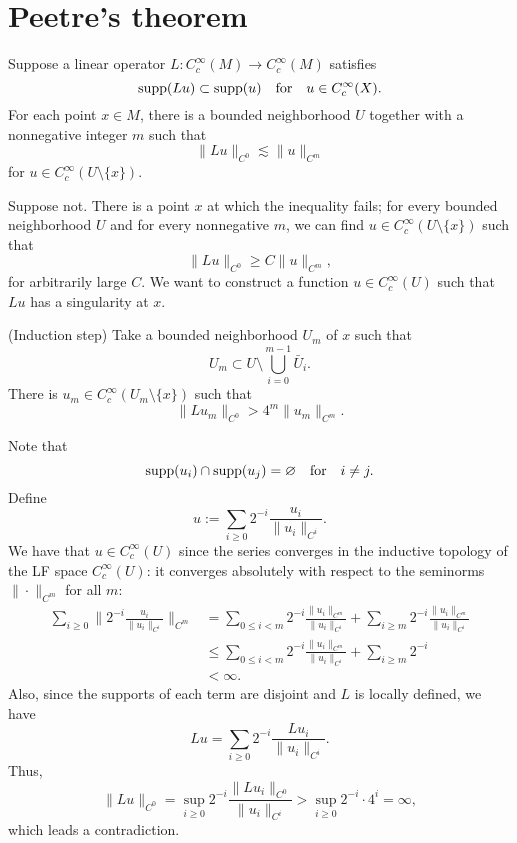 \documentclass[a4paper]{article}
\begin{document}
\section{Peetre's theorem}


\begin{lem}
Suppose a linear operator $L:C_c^\infty(M)\to C_c^\infty(M)$ satisfies
\[\operatorname{supp}(Lu)\subset\operatorname{supp}(u)\quad\text{for}\quad u\in C_c^\infty(X).\]
For each point $x\in M$, there is a bounded neighborhood $U$ together with a nonnegative integer $m$ such that 
\[\|Lu\|_{C^0}\lesssim\|u\|_{C^m}\]
for $u\in C_c^\infty(U\setminus\{x\})$.
\end{lem}
\begin{pf}
Suppose not.
There is a point $x$ at which the inequality fails; for every bounded neighborhood $U$ and for every nonnegative $m$, we can find $u\in C_c^\infty(U\setminus\{x\})$ such that
\[\|Lu\|_{C^0}\ge C\|u\|_{C^m},\]
for arbitrarily large $C$.
We want to construct a function $u\in C_c^\infty(U)$ such that $Lu$ has a singularity at $x$.

(Induction step)
Take a bounded neighborhood $U_m$ of $x$ such that
\[U_m\subset U\setminus\bigcup_{i=0}^{m-1}\bar U_i.\]
There is $u_m\in C_c^\infty(U_m\setminus\{x\})$ such that
\[\|Lu_m\|_{C^0}>4^m\|u_m\|_{C^m}.\]

Note that
\[\operatorname{supp}(u_i)\cap\operatorname{supp}(u_j)=\varnothing\quad\text{for}\quad i\ne j.\]
Define
\[u:=\sum_{i\ge0}2^{-i}\frac{u_i}{\|u_i\|_{C^i}}.\]
We have that $u\in C_c^\infty(U)$ since the series converges in the inductive topology of the LF space $C_c^\infty(U)$: it converges absolutely with respect to the seminorms $\|\cdot\|_{C^m}$ for all $m$:
\begin{align*}
\sum_{i\ge0}\|2^{-i}\frac{u_i}{\|u_i\|_{C^i}}\|_{C^m}
&=\sum_{0\le i<m}2^{-i}\frac{\|u_i\|_{C^m}}{\|u_i\|_{C^i}}+\sum_{i\ge m}2^{-i}\frac{\|u_i\|_{C^m}}{\|u_i\|_{C^i}}\\
&\le\sum_{0\le i<m}2^{-i}\frac{\|u_i\|_{C^m}}{\|u_i\|_{C^i}}+\sum_{i\ge m}2^{-i}\\
&<\infty.
\end{align*}
Also, since the supports of each term are disjoint and $L$ is locally defined, we have
\[Lu=\sum_{i\ge0}2^{-i}\frac{Lu_i}{\|u_i\|_{C^i}}.\]
Thus,
\[\|Lu\|_{C^0}=\sup_{i\ge0}2^{-i}\frac{\|Lu_i\|_{C^0}}{\|u_i\|_{C^i}}>\sup_{i\ge0}2^{-i}\cdot4^i=\infty,\]
which leads a contradiction.

\end{pf}
\end{document}
